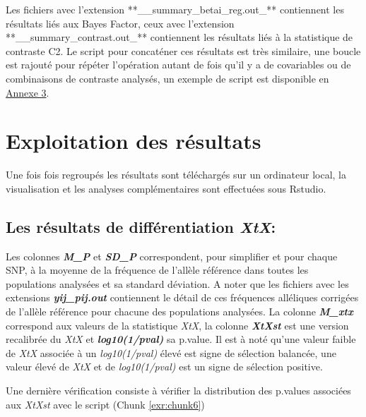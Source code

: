 \documentclass[
  openany]{book}
\theoremstyle{definition}
\theoremstyle{definition}
\theoremstyle{definition}
\theoremstyle{definition}
\theoremstyle{remark}
\begin{document}
Les fichiers avec l'extension **\_\_summary\_betai\_reg.out\_** contiennent les résultats liés aux Bayes Factor, ceux avec l'extension **\_\_summary\_contrast.out\_** contiennent les résultats liés à la statistique de contraste C2.
Le script pour concaténer ces résultats est très similaire, une boucle est rajouté pour répéter l'opération autant de fois qu'il y a de covariables ou de combinaisons de contraste analysés, un exemple de script est disponible en \protect\hyperlink{An3}{Annexe 3}.

\hypertarget{exploitation-des-ruxe9sultats}{%
\chapter*{Exploitation des résultats}\label{exploitation-des-ruxe9sultats}}

Une fois fois regroupés les résultats sont téléchargés sur un ordinateur local, la visualisation et les analyses complémentaires sont effectuées sous Rstudio.

\hypertarget{les-ruxe9sultats-de-diffuxe9rentiation-xtx}{%
\section*{\texorpdfstring{Les résultats de différentiation \emph{XtX}:}{Les résultats de différentiation XtX:}}\label{les-ruxe9sultats-de-diffuxe9rentiation-xtx}}

Les colonnes \textbf{\emph{M\_P}} et \textbf{\emph{SD\_P}} correspondent, pour simplifier et pour chaque SNP, à la moyenne de la fréquence de l'allèle référence dans toutes les populations analysées et sa standard déviation. A noter que les fichiers avec les extensions \textbf{\emph{yij\_pij.out}} contiennent le détail de ces fréquences alléliques corrigées de l'allèle référence pour chacune des populations analysées.
La colonne \textbf{\emph{M\_xtx}} correspond aux valeurs de la statistique \emph{XtX}, la colonne \textbf{\emph{XtXst}} est une version recalibrée du \emph{XtX} et \textbf{\emph{log10(1/pval)}} sa p.value.
Il est à noté qu'une valeur faible de \emph{XtX} associée à un \emph{log10(1/pval)} élevé est signe de sélection balancée, une valeur élevé de \emph{XtX} et de \emph{log10(1/pval)} est un signe de sélection positive.

Une dernière vérification consiste à vérifier la distribution des p.values associées aux \emph{XtXst} avec le script (Chunk \ref{exr:chunk6})
\end{document}

